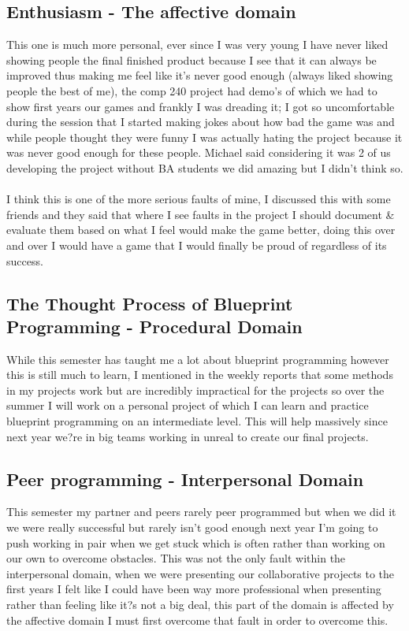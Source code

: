 \documentclass[10pt,a4paper]{report}
\begin{document}
	\subsection*{Enthusiasm - The affective domain}
	This one is much more personal, ever since I was very young I have never liked showing people the final finished product because I see that it can always be improved thus making me feel like it's never good enough (always liked showing people the best of me), the comp 240 project had demo's of which we had to show first years our games and frankly I was dreading it; I got so uncomfortable during the session that I started making jokes about how bad the game was and while people thought they were funny I was actually hating the project because it was never good enough for these people. Michael said considering it was 2 of us developing the project without BA students we did amazing but I didn't think so.
	\\\\
	I think this is one of the more serious faults of mine, I discussed this with some friends and they said that where I see faults in the project I should document \& evaluate them based on what I feel would make the game better, doing this over and over I would have a game that I would finally be proud of regardless of its success.
	
	\subsection*{The Thought Process of Blueprint Programming - Procedural Domain}
	While this semester has taught me a lot about blueprint programming however this is still much to learn, I mentioned in the weekly reports that some methods in my projects work but are incredibly impractical for the projects so over the summer I will work on a personal project of which I can learn and practice blueprint programming on an intermediate level. This will help massively since next year we?re in big teams working in unreal to create our final projects.
	
	\subsection*{Peer programming - Interpersonal Domain}
	This semester my partner and peers rarely peer programmed but when we did it we were really successful but rarely isn't good enough next year I'm going to push working in pair when we get stuck which is often rather than working on our own to overcome obstacles. This was not the only fault within the interpersonal domain, when we were presenting our collaborative projects to the first years I felt like I could have been way more professional when presenting rather than feeling like it?s not a big deal, this part of the domain is affected by the affective domain I must first overcome that fault in order to overcome this.
	
\end{document}
